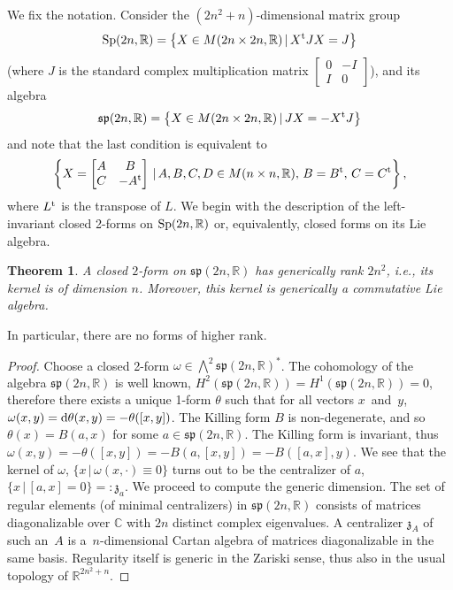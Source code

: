 \documentclass[pdftex]{sigma}
\numberwithin{equation}{section}
\newtheorem{Theorem}{Theorem}[section]
{ \theoremstyle{definition}
\newtheorem{Definition}[Theorem]{Definition}
\newtheorem{Example}[Theorem]{Example}
\newtheorem{Remark}[Theorem]{Remark} }
\begin{document}
We fix the notation. Consider the $(2n^2+n)$-dimensional matrix group
\begin{gather*}
{\rm Sp}(2n,\mathbb{R})=\big\{X\in M(2n\times 2n,\mathbb{R})\,|\,X^{\rm t}JX=J\big\}
\end{gather*}
(where $J$ is the standard complex multiplication matrix $\left[\begin{smallmatrix} 0&-I\\ I&0 \end{smallmatrix}\right]$), and its algebra
\begin{gather*}
\mathfrak{sp}(2n,\mathbb{R})=\big\{X\in M(2n\times 2n,\mathbb{R})\,|\,JX=-X^{\rm t}J\big\}
\end{gather*}
and note that the last condition is equivalent to
\begin{gather}
\left\{X=\left[
\begin{matrix}
A & B\\
C & -A^{\rm t}
\end{matrix}
\right]\,|\,A,B,C,D\in M(n\times n,\mathbb{R}),\,B=B^{\rm t},\,C=C^{\rm t}\right\}, \label{(ast)}
\end{gather}
where $L^{\rm t}$ is the transpose of $L$. We begin with the description of the left-invariant closed 2-forms on ${\rm Sp}(2n,\mathbb{R})$ or, equivalently, closed forms on its Lie algebra.
\begin{Theorem}
A closed $2$-form on $\mathfrak{sp}(2n,\mathbb{R})$ has generically rank $2n^2$, i.e., its kernel is of dimension $n$. Moreover, this kernel is generically a commutative Lie algebra.
\end{Theorem}
In particular, there are no forms of higher rank.
\begin{proof}
Choose a closed 2-form $\omega\in\bigwedge^2\mathfrak{sp}(2n,\mathbb{R})^*$. The cohomology of the algebra $\mathfrak{sp}(2n,\mathbb{R})$ is well known, $H^2(\mathfrak{sp}(2n,\mathbb{R})) = H^1(\mathfrak{sp}(2n,\mathbb{R})) = 0$, therefore there exists a unique 1-form $\theta$ such that for all vectors $x$~and~$y$, $\omega(x,y)={\rm d}\theta(x,y)=-\theta([x,y])$. The Killing form $B$ is non-degenerate, and so $\theta(x)=B(a,x)$ for some $a\in\mathfrak{sp}(2n,\mathbb{R})$. The Killing form is invariant, thus $\omega(x,y)=-\theta([x,y])=-B(a,[x,y])=-B([a,x],y)$. We see that the kernel of $\omega$, $\{x\,|\,\omega(x,\cdot)\equiv 0\}$ turns out to be the centralizer of $a$, $\{x\,|\,[a,x]=0\}=:\mathfrak{z}_a$.
We proceed to compute the generic dimension. The set of regular elements (of minimal centralizers) in $\mathfrak{sp}(2n,\mathbb{R})$ consists of matrices diagonalizable over $\mathbb{C}$ with $2n$ distinct complex eigenvalues. A centralizer $\mathfrak{z}_A$ of such an~$A$ is a~$n$-dimensional Cartan algebra of matrices diagonalizable in the same basis. Regularity itself is generic in the Zariski sense, thus also in the usual topology of $\mathbb{R}^{2n^2+n}$.
\end{proof}
\end{document}
